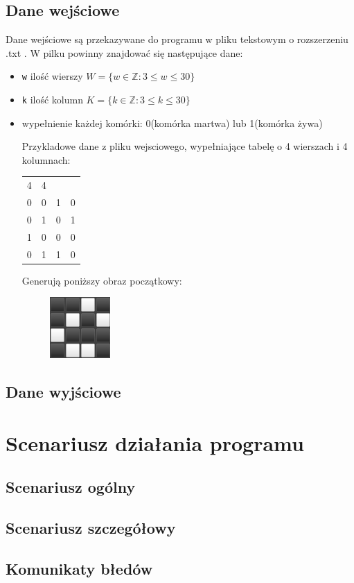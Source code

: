 \documentclass[a4paper]{article}
\begin{document}
\subsection{Dane wej\'sciowe}
Dane wej\'sciowe s\k{a} przekazywane do programu w pliku tekstowym o rozszerzeniu .txt . W pilku powinny znajdowa\'c si\k{e} nast\k{e}puj\k{a}ce dane: 
\begin{itemize}
	\item \texttt{w} ilo\'s\'c wierszy $W = \{ w \in \mathbb{Z} : 3 \leq w \leq 30 \} $
	\item \texttt{k} ilo\'s\'c kolumn $K = \{ k \in \mathbb{Z} : 3 \leq k \leq 30 \} $
	\item wype\l{}nienie ka\.zdej kom\'orki: 0(kom\'orka martwa) lub 1(kom\'orka \.zywa)
		
		Przykladowe dane z pliku wejsciowego, wype\l{}niaj\k{a}ce tabel\k{e} o 4 wierszach i 4 kolumnach:
		\begin{table}[h!]
		\begin{center}
			\begin{tabular}{c c c c}
				4 & 4         \\
				0 & 0 & 1 & 0 \\
				0 & 1 & 0 & 1 \\
				1 & 0 & 0 & 0 \\
				0 & 1 & 1 & 0 \\
			\end{tabular}
		\end{center}
		\end{table}

		Generuj\k{a} poni\.zszy obraz pocz\k{a}tkowy:

		\begin{figure}[h]
			\centering
			\includegraphics{obraz}
		\end{figure}
\end{itemize}

\subsection{Dane wyj\'sciowe}


\section{Scenariusz dzia\l{}ania programu}
\subsection{Scenariusz og\'olny}
\subsection{Scenariusz szczeg\'o\l{}owy}
\subsection{Komunikaty b\l{}ed\'ow}
\end{document}
